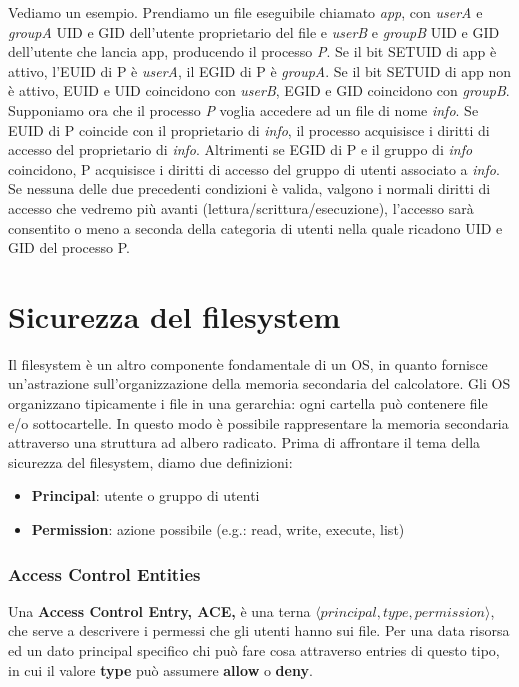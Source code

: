 Vediamo un esempio. Prendiamo un file eseguibile chiamato \textit{app}, con \textit{userA} e \textit{groupA} UID e GID dell'utente proprietario del file e \textit{userB} e \textit{groupB} UID e GID dell'utente che lancia app, producendo il processo \textit{P}. Se il bit SETUID di app è attivo, l'EUID di P è \textit{userA}, il EGID di P è \textit{groupA}. Se il bit SETUID di app non è attivo, EUID e UID coincidono con \textit{userB}, EGID e GID coincidono con \textit{groupB}. Supponiamo ora che il processo \textit{P} voglia accedere ad un file di nome \textit{info}. Se EUID di P coincide con il proprietario di \textit{info}, il processo acquisisce i diritti di accesso del proprietario di \textit{info}. Altrimenti se EGID di P e il gruppo di \textit{info} coincidono, P acquisisce i diritti di accesso del gruppo di utenti associato a \textit{info}. Se nessuna delle due precedenti condizioni è valida, valgono i normali diritti di accesso che vedremo più avanti (lettura/scrittura/esecuzione), l'accesso sarà consentito o meno a seconda della categoria di utenti nella quale ricadono UID e GID del processo P.

\section{Sicurezza del filesystem}
Il filesystem è un altro componente fondamentale di un OS, in quanto fornisce un'astrazione sull'organizzazione della memoria secondaria del calcolatore. Gli OS organizzano tipicamente i file in una gerarchia: ogni cartella può contenere file e/o sottocartelle. In questo modo è possibile rappresentare la memoria secondaria attraverso una struttura ad albero radicato. Prima di affrontare il tema della sicurezza del filesystem, diamo due definizioni:
\begin{itemize}
  \item \textbf{Principal}: utente o gruppo di utenti
  \item \textbf{Permission}: azione possibile (e.g.: read, write, execute, list)
\end{itemize}

\subsubsection{Access Control Entities}
Una \textbf{Access Control Entry, ACE,} è una terna $\langle principal, type, permission \rangle$, che serve a descrivere i permessi che gli utenti hanno sui file. Per una data risorsa ed un dato principal specifico chi può fare cosa attraverso entries di questo tipo, in cui il valore \textbf{type} può assumere \textbf{allow} o \textbf{deny}. \newline \newline

